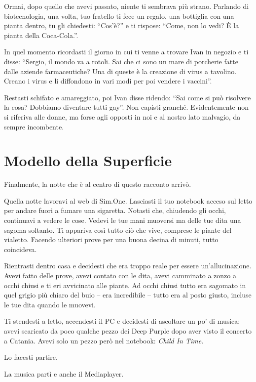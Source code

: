 Ormai, dopo quello che avevi passato, niente ti sembrava più strano. Parlando di biotecnologia, una volta, tuo fratello ti fece un regalo, una bottiglia con una pianta dentro, tu gli chiedesti: ``Cos'è?'' e ti rispose: “Come, non lo vedi? È la pianta della Coca-Cola.”.

In quel momento ricordasti il giorno in cui ti venne a trovare Ivan in negozio e ti disse: “Sergio, il mondo va a rotoli. Sai che ci sono un mare di porcherie fatte dalle aziende farmaceutiche? Una di queste è la creazione di virus a tavolino. Creano i virus e li diffondono in vari modi per poi vendere i vaccini”.

Restasti schifato e amareggiato, poi Ivan disse ridendo: “Sai come si può risolvere la cosa? Dobbiamo diventare tutti gay”. Non capisti granché. Evidentemente non si riferiva alle donne, ma forse agli opposti in noi e al nostro lato malvagio, da sempre incombente.

\section{Modello della Superficie}
\label{modello_di_superficie}

Finalmente, la notte che è al centro di questo racconto arrivò.

Quella notte lavoravi al web di Sim.One. Lasciasti il tuo notebook acceso sul letto per andare fuori a fumare una sigaretta. Notasti che, chiudendo gli occhi, continuavi a vedere le cose. Vedevi le tue mani muoversi ma delle tue dita una sagoma soltanto. Ti appariva così tutto ciò che vive, comprese le piante del vialetto. Facendo ulteriori prove per una buona decina di minuti, tutto coincideva.

Rientrasti dentro casa e decidesti che era troppo reale per essere un'allucinazione. Avevi fatto delle prove, avevi contato con le dita, avevi camminato a zonzo a occhi chiusi e ti eri avvicinato alle piante. Ad occhi chiusi tutto era sagomato in quel grigio più chiaro del buio -- era incredibile -- tutto era al posto giusto, incluse le tue dita quando le muovevi.

Ti stendesti a letto, accendesti il PC e decidesti di ascoltare un po' di musica: avevi scaricato da poco qualche pezzo dei Deep Purple dopo aver visto il concerto a Catania. Avevi solo un pezzo però nel notebook: \textit{Child In Time}.

Lo facesti partire.

La musica partì e anche il Mediaplayer.

